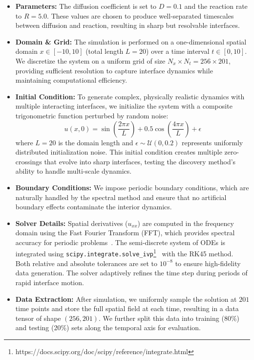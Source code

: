 \documentclass[twoside,11pt]{article}
\let\cite\citep
\newcommand{\1}{{\bf 1}}
\newcommand{\0}{{\bf 0}}
\begin{document}
\begin{itemize}
    \item \textbf{Parameters:} The diffusion coefficient is set to $D=0.1$ and the reaction rate to $R=5.0$. These values are chosen to produce well-separated timescales between diffusion and reaction, resulting in sharp but resolvable interfaces.
    
    \item \textbf{Domain \& Grid:} The simulation is performed on a one-dimensional spatial domain $x \in [-10, 10]$ (total length $L=20$) over a time interval $t \in [0, 10]$. We discretize the system on a uniform grid of size $N_x \times N_t = 256 \times 201$, providing sufficient resolution to capture interface dynamics while maintaining computational efficiency.
    
    \item \textbf{Initial Condition:} To generate complex, physically realistic dynamics with multiple interacting interfaces, we initialize the system with a composite trigonometric function perturbed by random noise:
    \begin{equation}
        u(x,0) = \sin\left(\frac{2\pi x}{L}\right) + 0.5\cos\left(\frac{4\pi x}{L}\right) + \epsilon
    \end{equation}
    where $L=20$ is the domain length and $\epsilon \sim \mathcal{U}(0, 0.2)$ represents uniformly distributed initialization noise. This initial condition creates multiple zero-crossings that evolve into sharp interfaces, testing the discovery method's ability to handle multi-scale dynamics.
    
    \item \textbf{Boundary Conditions:} We impose periodic boundary conditions, which are naturally handled by the spectral method and ensure that no artificial boundary effects contaminate the interior dynamics.
    
    \item \textbf{Solver Details:} Spatial derivatives ($u_{xx}$) are computed in the frequency domain using the Fast Fourier Transform (FFT), which provides spectral accuracy for periodic problems~\cite{trefethen2000spectral}. The semi-discrete system of ODEs is integrated using \texttt{scipy.integrate.solve\_ivp}\footnote{https://docs.scipy.org/doc/scipy/reference/integrate.html}~\cite{virtanen2020scipy} with the RK45 method. Both relative and absolute tolerances are set to $10^{-8}$ to ensure high-fidelity data generation. The solver adaptively refines the time step during periods of rapid interface motion.
    
    \item \textbf{Data Extraction:} After simulation, we uniformly sample the solution at $201$ time points and store the full spatial field at each time, resulting in a data tensor of shape $(256, 201)$. We further split this data into training (80\%) and testing (20\%) sets along the temporal axis for evaluation.
\end{itemize}
\end{document}
